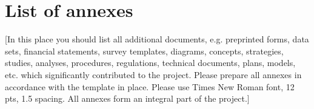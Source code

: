 \section{List of annexes}\label{sec:list-of-annexes}
[In this place you should list all additional documents, e.g. preprinted forms, data sets, financial statements, survey templates, diagrams,
    concepts, strategies, studies, analyses, procedures, regulations, technical documents, plans, models, etc. which significantly contributed to the project.
Please prepare all annexes in accordance with the template in place.
Please use Times New Roman font, 12 pts, 1.5 spacing.
All annexes form an integral part of the project.]

